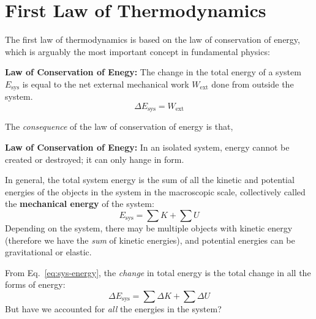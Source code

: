 \section{First Law of Thermodynamics}

The first law of thermodynamics is based on the law of conservation of energy,
which is arguably the most important concept in fundamental physics:
\begin{definition}
  \textbf{Law of Conservation of Enegy:} The change in the total energy of a
  system $E_\text{sys}$ is equal to the net external mechanical work
  $W_\text{ext}$ done from outside the system.
  \begin{equation}
    \boxed{
      \Delta E_\text{sys}=W_\text{ext}
    }
    \label{eq:conservation-of-energy}
  \end{equation}
\end{definition}
The \emph{consequence} of the law of conservation of energy is that,
\begin{definition}
  \textbf{Law of Conservation of Enegy:} In an isolated system, energy cannot
  be created or destroyed; it can only hange in form.
\end{definition}
In general, the total system energy is the sum of all the kinetic and potential
energies of the objects in the system in the macroscopic scale, collectively
called the \textbf{mechanical energy} of the system:
\begin{equation}
  E_\text{sys} = \sum K + \sum U
  \label{eq:sys-energy}
\end{equation}
Depending on the system, there may be multiple objects with kinetic energy
(therefore we have the \emph{sum} of kinetic energies), and potential energies
can be gravitational or elastic.

From Eq.~\ref{eq:sys-energy}, the \emph{change} in total energy is the total
change in all the forms of energy:
\begin{equation}
  \Delta E_\text{sys} = \sum\Delta K + \sum\Delta U
\end{equation}
But have we accounted for \emph{all} the energies in the system?

